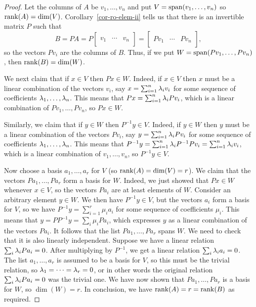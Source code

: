 \documentclass[reqno]{amsart}
\theoremstyle{definition}
\begin{document}
\begin{proof}
 Let the columns of $A$ be $v_1,\dotsc,v_n$ and put
 $V=\operatorname{span}(v_1,\dotsc,v_n)$ so $\operatorname{rank}(A)=\dim(V)$.
 Corollary~\ref{cor-ro-elem-ii} tells us that there is an invertible
 matrix $P$ such that 
 \[ B=PA= P
    \left[\begin{array}{c|c|c}
     && \\ v_1 & \cdots & v_n \\ &&
    \end{array}\right]
    = 
    \left[\begin{array}{c|c|c}
     && \\ Pv_1 & \cdots & Pv_n \\ &&
    \end{array}\right],
 \]
 so the vectors $Pv_i$ are the columns of $B$.  Thus, if we put
 $W=\operatorname{span}(Pv_1,\dotsc,Pv_n)$, then $\operatorname{rank}(B)=\dim(W)$.

 We next claim that if $x\in V$ then $Px\in W$.  Indeed, if $x\in V$
 then $x$ must be a linear combination of the vectors $v_i$, say
 $x=\sum_{i=1}^n\lambda_iv_i$ for some sequence of coefficients
 $\lambda_1,\dotsc,\lambda_n$.  This means that $Px=\sum_{i=1}^n\lambda_iPv_i$,
 which is a linear combination of $Pv_1,\dotsc,Pv_n$, so $Px\in W$.

 Similarly, we claim that if $y\in W$ then $P^{-1}y\in V$.  Indeed, if
 $y\in W$ then $y$ must be a linear combination of the vectors $Pv_i$,
 say $y=\sum_{i=1}^n\lambda_iPv_i$ for some sequence of coefficients
 $\lambda_1,\dotsc,\lambda_n$.  This means that
 $P^{-1}y=\sum_{i=1}^n\lambda_iP^{-1}Pv_i=\sum_{i=1}^n\lambda_iv_i$,
 which is a linear combination of $v_1,\dotsc,v_n$, so $P^{-1}y\in V$.

 Now choose a basis $a_1,\dotsc,a_r$ for $V$ (so
 $\operatorname{rank}(A)=\dim(V)=r$).  We claim that the vectors $Pa_1,\dotsc,Pa_r$
 form a basis for $W$.  Indeed, we just showed that $Px\in W$ whenever
 $x\in V$, so the vectors $Pa_i$ are at least elements of $W$.
 Consider an arbitrary element $y\in W$.  We then have $P^{-1}y\in V$,
 but the vectors $a_i$ form a basis for $V$, so we have
 $P^{-1}y=\sum_{i=1}^r\mu_ia_i$ for some sequence of coefficients
 $\mu_i$.  This means that $y=PP^{-1}y=\sum_i\mu_iPa_i$, which
 expresses $y$ as a linear combination of the vectors $Pa_i$.  It
 follows that the list $Pa_1,\dotsc,Pa_r$ spans $W$.  We need to check
 that it is also linearly independent.  Suppose we have a linear
 relation $\sum_i\lambda_iPa_i=0$.  After multiplying by $P^{-1}$, we get
 a linear relation $\sum_i\lambda_ia_i=0$.  The list $a_1,\dotsc,a_r$ is
 assumed to be a basis for $V$, so this must be the trivial relation,
 so $\lambda_1=\dotsb=\lambda_r=0$, or in other words the original relation 
 $\sum_i\lambda_iPa_i=0$ was the trivial one.  We have now shown that
 $Pa_1,\dotsc,Pa_r$ is a basis for $W$, so $\dim(W)=r$.  In
 conclusion, we have $\operatorname{rank}(A)=r=\operatorname{rank}(B)$ as required.
\end{proof}
\end{document}
